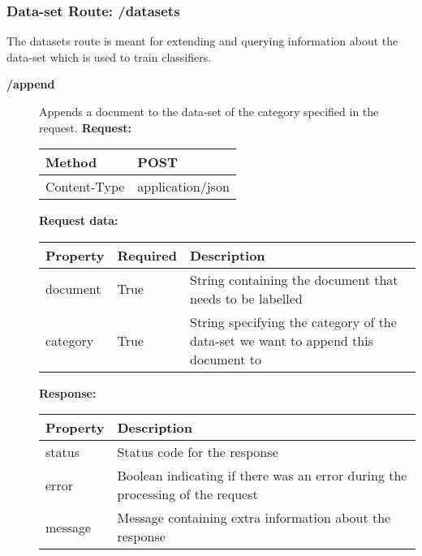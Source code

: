 \subsubsection{Data-set Route: /datasets}
The datasets route is meant for extending and querying information about the data-set which is used to train classifiers. 

\begin{description}


\item [{\large \textbf{/append}}]
Appends a document to the data-set of the category specified in the request.
\newline
\newline
\textbf{Request:}
\newline
\newline
\begin{tabular}{ | l | l |}
\hline
Method & POST\\ \hline
Content-Type & application/json\\ \hline
\end{tabular}
\newline
\newline
\textbf{Request data:}
\newline
\newline
\resizebox{\textwidth}{!} {
\begin{tabular}{ | l | l | l |}
\hline
\textbf{Property} & \textbf{Required} & \textbf{Description}\\ \hline
document & True & String containing the document that needs to be labelled\\ \hline
category & True & String specifying the category of the data-set we want to append this document to\\ \hline
\end{tabular}}
\newline
\newline
\textbf{Response:}
\newline
\newline
\resizebox{\textwidth}{!} {
\begin{tabular}{ | l | l |}
\hline
\textbf{Property} & \textbf{Description}\\ \hline
status & Status code for the response\\ \hline
error & Boolean indicating if there was an error during the processing of the request\\ \hline
message & Message containing extra information about the response\\ \hline
\end{tabular}}



\end{description}

